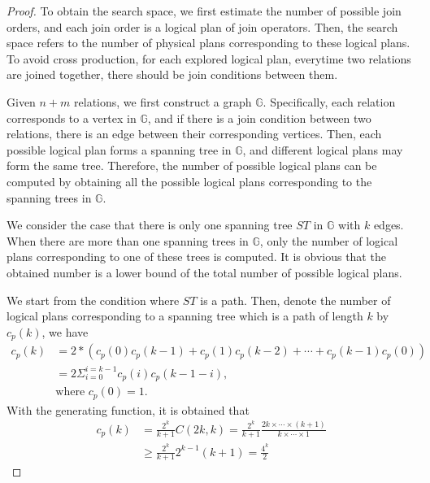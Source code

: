 \begin{proof}
    To obtain the search space, we first estimate the number of possible join orders, and each join order is a logical plan of join operators.
    Then, the search space refers to the number of physical plans corresponding to these logical plans.
    To avoid cross production, for each explored logical plan, everytime two relations are joined together, there should be join conditions between them.

    Given $n + m$ relations, we first construct a graph $\mathbb{G}$.
    Specifically, each relation corresponds to a vertex in $\mathbb{G}$, and if there is a join condition between two relations, there is an edge between their corresponding vertices.
    Then, each possible logical plan forms a spanning tree in $\mathbb{G}$, and different logical plans may form the same tree.
    Therefore, the number of possible logical plans can be computed by obtaining all the possible logical plans corresponding to the spanning trees in $\mathbb{G}$.

    We consider the case that there is only one spanning tree $ST$ in $\mathbb{G}$ with $k$ edges.
    When there are more than one spanning trees in $\mathbb{G}$, only the number of logical plans corresponding to one of these trees is computed.
    It is obvious that the obtained number is a lower bound of the total number of possible logical plans.

    We start from the condition where $ST$ is a path.
    Then, denote the number of logical plans corresponding to a spanning tree which is a path of length $k$ by $c_p(k)$, we have
    \begin{equation*}
        \begin{split}
            c_p(k) & = 2 * (c_p(0)c_p(k-1) + c_p(1)c_p(k-2) + \cdots + c_p(k-1)c_p(0)) \\
            & = 2\Sigma_{i=0}^{i=k-1}c_p(i)c_p(k-1-i), \\
            & \text{where } c_p(0) = 1.
        \end{split}
    \end{equation*}
    With the generating function, it is obtained that
    \begin{equation*}
        \begin{split}
            c_p(k) & = \frac{2^k}{k+1}C(2k, k) = \frac{2^k}{k+1}\frac{2k \times \cdots \times (k+1)}{k \times \cdots \times 1} \\
            & \geq \frac{2^k}{k+1}2^{k-1}(k+1) = \frac{4^k}{2}
        \end{split}
    \end{equation*}


\end{proof}
